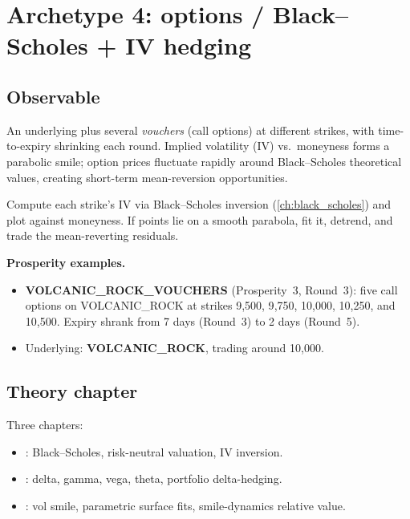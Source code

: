 \section{Archetype 4: options / Black--Scholes + IV hedging}
\label{sec:archetype_options}

\subsection{Observable}

An underlying plus several \emph{vouchers} (call options) at
different strikes, with time-to-expiry shrinking each round.  Implied
volatility (IV) vs.\ moneyness forms a parabolic smile; option
prices fluctuate rapidly around Black--Scholes theoretical values,
creating short-term mean-reversion opportunities.

\begin{keyfactbox}[Diagnostic]
Compute each strike's IV via Black--Scholes inversion
(\cref{ch:black_scholes}) and plot against moneyness.  If points lie
on a smooth parabola, fit it, detrend, and trade the
mean-reverting residuals.
\end{keyfactbox}

\noindent
\textbf{Prosperity examples.}
\begin{itemize}
  \item \textbf{VOLCANIC\_ROCK\_VOUCHERS} (Prosperity~3, Round~3):
  five call options on VOLCANIC\_ROCK at strikes 9{,}500, 9{,}750,
  10{,}000, 10{,}250, and 10{,}500.  Expiry shrank from 7 days
  (Round~3) to 2 days (Round~5).
  \item Underlying: \textbf{VOLCANIC\_ROCK}, trading around 10{,}000.
\end{itemize}

\subsection{Theory chapter}

Three chapters:
\begin{itemize}
  \item {}: Black--Scholes, risk-neutral
  valuation, IV inversion.
  \item {}: delta, gamma, vega, theta,
  portfolio delta-hedging.
  \item {}: vol smile, parametric surface fits,
  smile-dynamics relative value.
\end{itemize}

